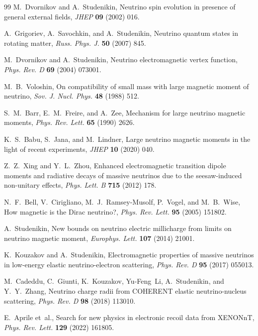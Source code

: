 \documentclass[a4paper,11pt]{article}
\begin{document}
\begin{thebibliography}{99}
M.~Dvornikov and A.~Studenikin,
Neutrino spin evolution in presence of general external fields,
{\em JHEP} {\bf 09} (2002) 016.

A.~Grigoriev, A.~Savochkin, and A.~Studenikin,
Neutrino quantum states in rotating matter,
{\em Russ. Phys. J.} {\bf 50} (2007) 845.

M.~Dvornikov and A.~Studenikin,
Neutrino electromagnetic vertex function,
{\em Phys. Rev. D} {\bf 69} (2004) 073001.

M.~B.~Voloshin,
On compatibility of small mass with large magnetic moment of neutrino,
{\em Sov. J. Nucl. Phys.} {\bf 48} (1988) 512.

S.~M.~Barr, E.~M.~Freire, and A.~Zee,
Mechanism for large neutrino magnetic moments,
{\em Phys. Rev. Lett.} {\bf 65} (1990) 2626.

K.~S.~Babu, S.~Jana, and M.~Lindner,
Large neutrino magnetic moments in the light of recent experiments,
{\em JHEP} {\bf 10} (2020) 040.

Z.~Z.~Xing and Y.~L.~Zhou,
Enhanced electromagnetic transition dipole moments and radiative decays of massive neutrinos due to the seesaw-induced non-unitary effects,
{\em Phys. Lett. B} {\bf 715} (2012) 178.

N.~F.~Bell, V.~Cirigliano, M.~J.~Ramsey-Musolf, P.~Vogel, and M.~B.~Wise,
How magnetic is the Dirac neutrino?,
{\em Phys. Rev. Lett.} {\bf 95} (2005) 151802.

A.~Studenikin,
New bounds on neutrino electric millicharge from limits on neutrino magnetic moment,
{\em Europhys. Lett.} {\bf 107} (2014) 21001.

K.~Kouzakov and A.~Studenikin,
Electromagnetic properties of massive neutrinos in low-energy elastic neutrino-electron scattering,
{\em Phys. Rev. D} {\bf 95} (2017) 055013.

M.~Cadeddu, C.~Giunti, K.~Kouzakov, Yu-Feng~Li, A.~Studenikin, and Y.~Y.~Zhang,
Neutrino charge radii from COHERENT elastic neutrino-nucleus scattering,
{\em Phys. Rev. D} {\bf 98} (2018) 113010.

E.~Aprile et~al.,
Search for new physics in electronic recoil data from XENONnT,
{\em Phys. Rev. Lett.} {\bf 129} (2022) 161805.


\end{thebibliography}
\end{document}
